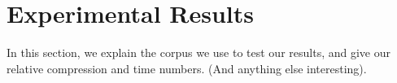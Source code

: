 \section{Experimental Results}
\label{sec:experiments}

In this section, we explain the corpus we use to test our results, and
give our relative compression and time numbers.  (And anything else interesting).